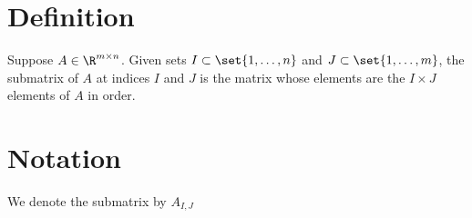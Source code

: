 
\section*{Definition}

Suppose $A \in \R ^{m \times  n}$.
Given sets $I \subset \set{1, \dots , n}$ and $J \subset \set{1, \dots , m}$, the submatrix of $A$ at indices $I$ and $J$ is the matrix whose elements are the $I \times  J$ elements of $A$ in order.

\section*{Notation}

We denote the submatrix by $A_{I, J}$


\blankpage
